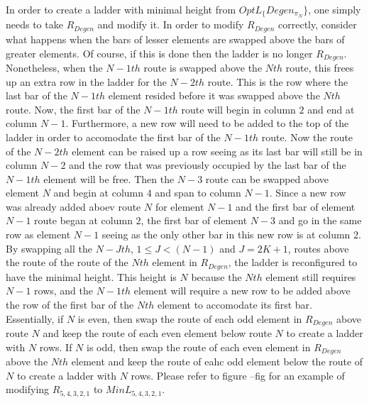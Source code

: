    In order to create a ladder with minimal height from $OptL_\{Degen_{\pi_{N}}\}$, one simply needs to 
   take $R_{Degen}$ and modify it. In order to modify $R_{Degen}$ correctly, consider what happens when 
   the bars of lesser elements are swapped above the bars of greater elements. Of course, if this is done then 
   the ladder is no longer $R_{Degen}$. Nonetheless, when the $N-1th$ route is swapped above the $Nth$ route, 
   this frees up an extra row in the ladder for the $N-2th$ route. This is the row where the last bar of the $N-1th$ element resided
   before it was swapped above the $Nth$ route. Now, the first bar of the $N-1th$ route will begin in column $2$ and end at column $N-1$. 
   Furthermore, a new row will need to be added to the top of the ladder in order to accomodate the first bar of the $N-1th$ route. Now the route 
   of the $N-2th$ element can be raised up a row seeing as its last bar will still be in column $N-2$ and the row 
   that was previously occupied by the last bar of the $N-1th$ element will be free. Then the $N-3$ route can be swapped above 
   element $N$ and begin at column $4$ and span to column $N-1$. Since a new row was already added aboev route $N$ for element $N-1$
   and the first bar of element $N-1$ route began at column $2$, the first bar of element $N-3$ and go in the 
   same row as element $N-1$ seeing as the only other bar in this new row is at column 2. By  swapping 
   all the  $N-Jth$, $1 \leq J < (N-1)$ and $J=2K+1$, routes  above the route of the route of the $Nth$
   element in $R_{Degen}$, the ladder is reconfigured to have the minimal height. This height is $N$ because the 
   $Nth$ element still requires $N-1$ rows, and the $N-1th$ element will require a new row to be added above 
   the row of the first bar of the $Nth$ element to accomodate its first bar. Essentially, if $N$ is even, then 
   swap the route of each odd element in $R_{Degen}$ above route $N$ and keep the route of each even element below route $N$ 
   to create a ladder with $N$ rows. If $N$ is odd, then swap the route of each even element in $R_{Degen}$ above the 
   $Nth$ element and keep the route of eahc odd element below the route of $N$ to create a ladder with $N$ rows. Please refer 
   to figure --fig for an example of modifying $R_{5,4,3,2,1}$ to $MinL_{5,4,3,2,1}$.\pagebreak


